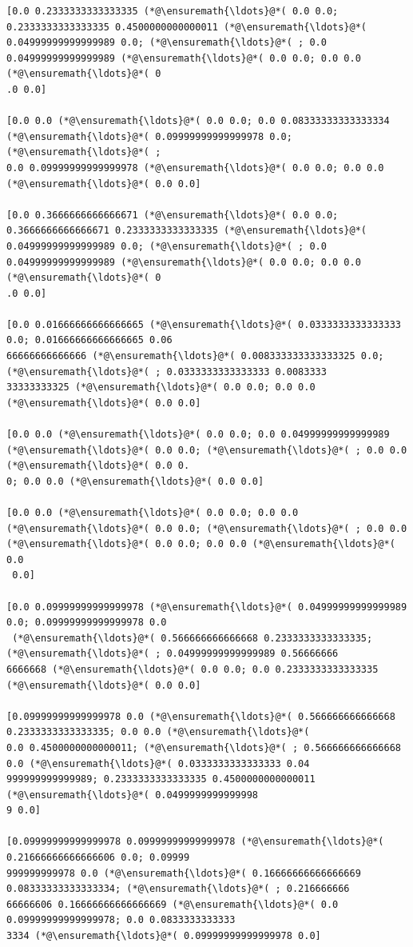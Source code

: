 \documentclass[12pt,a4paper]{article}
\begin{document}
\begin{lstlisting}
[0.0 0.2333333333333335 (*@\ensuremath{\ldots}@*( 0.0 0.0; 0.2333333333333335 0.4500000000000011 (*@\ensuremath{\ldots}@*( 
0.04999999999999989 0.0; (*@\ensuremath{\ldots}@*( ; 0.0 0.04999999999999989 (*@\ensuremath{\ldots}@*( 0.0 0.0; 0.0 0.0 (*@\ensuremath{\ldots}@*( 0
.0 0.0]

[0.0 0.0 (*@\ensuremath{\ldots}@*( 0.0 0.0; 0.0 0.08333333333333334 (*@\ensuremath{\ldots}@*( 0.09999999999999978 0.0; (*@\ensuremath{\ldots}@*( ; 
0.0 0.09999999999999978 (*@\ensuremath{\ldots}@*( 0.0 0.0; 0.0 0.0 (*@\ensuremath{\ldots}@*( 0.0 0.0]

[0.0 0.3666666666666671 (*@\ensuremath{\ldots}@*( 0.0 0.0; 0.3666666666666671 0.2333333333333335 (*@\ensuremath{\ldots}@*( 
0.04999999999999989 0.0; (*@\ensuremath{\ldots}@*( ; 0.0 0.04999999999999989 (*@\ensuremath{\ldots}@*( 0.0 0.0; 0.0 0.0 (*@\ensuremath{\ldots}@*( 0
.0 0.0]

[0.0 0.01666666666666665 (*@\ensuremath{\ldots}@*( 0.0333333333333333 0.0; 0.01666666666666665 0.06
66666666666666 (*@\ensuremath{\ldots}@*( 0.008333333333333325 0.0; (*@\ensuremath{\ldots}@*( ; 0.0333333333333333 0.0083333
33333333325 (*@\ensuremath{\ldots}@*( 0.0 0.0; 0.0 0.0 (*@\ensuremath{\ldots}@*( 0.0 0.0]

[0.0 0.0 (*@\ensuremath{\ldots}@*( 0.0 0.0; 0.0 0.04999999999999989 (*@\ensuremath{\ldots}@*( 0.0 0.0; (*@\ensuremath{\ldots}@*( ; 0.0 0.0 (*@\ensuremath{\ldots}@*( 0.0 0.
0; 0.0 0.0 (*@\ensuremath{\ldots}@*( 0.0 0.0]

[0.0 0.0 (*@\ensuremath{\ldots}@*( 0.0 0.0; 0.0 0.0 (*@\ensuremath{\ldots}@*( 0.0 0.0; (*@\ensuremath{\ldots}@*( ; 0.0 0.0 (*@\ensuremath{\ldots}@*( 0.0 0.0; 0.0 0.0 (*@\ensuremath{\ldots}@*( 0.0
 0.0]

[0.0 0.09999999999999978 (*@\ensuremath{\ldots}@*( 0.04999999999999989 0.0; 0.09999999999999978 0.0
 (*@\ensuremath{\ldots}@*( 0.566666666666668 0.2333333333333335; (*@\ensuremath{\ldots}@*( ; 0.04999999999999989 0.56666666
6666668 (*@\ensuremath{\ldots}@*( 0.0 0.0; 0.0 0.2333333333333335 (*@\ensuremath{\ldots}@*( 0.0 0.0]

[0.09999999999999978 0.0 (*@\ensuremath{\ldots}@*( 0.566666666666668 0.2333333333333335; 0.0 0.0 (*@\ensuremath{\ldots}@*( 
0.0 0.4500000000000011; (*@\ensuremath{\ldots}@*( ; 0.566666666666668 0.0 (*@\ensuremath{\ldots}@*( 0.0333333333333333 0.04
999999999999989; 0.2333333333333335 0.4500000000000011 (*@\ensuremath{\ldots}@*( 0.0499999999999998
9 0.0]

[0.09999999999999978 0.09999999999999978 (*@\ensuremath{\ldots}@*( 0.21666666666666606 0.0; 0.09999
999999999978 0.0 (*@\ensuremath{\ldots}@*( 0.16666666666666669 0.08333333333333334; (*@\ensuremath{\ldots}@*( ; 0.216666666
66666606 0.16666666666666669 (*@\ensuremath{\ldots}@*( 0.0 0.09999999999999978; 0.0 0.0833333333333
3334 (*@\ensuremath{\ldots}@*( 0.09999999999999978 0.0]


\end{lstlisting}
\end{document}
